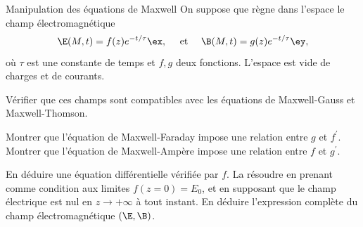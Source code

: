 
\begin{exo}[PC][1][TD]{Manipulation des équations de Maxwell}
On suppose que règne dans l'espace le champ électromagnétique 
\begin{equation}
  \E(M, t)=f(z) e^{-t / \tau} \ex, \quad \text{ et } \quad \B(M, t)=g(z) e^{-t / \tau} \ey,
\end{equation}
où $\tau$ est une constante de temps et $f, g$ deux fonctions. L'espace est vide de charges et de courants.
\begin{quest}
  \item   Vérifier que ces champs sont compatibles avec les équations de Maxwell-Gauss et Maxwell-Thomson.
  \item  Montrer que l'équation de Maxwell-Faraday impose une relation entre $g$ et $f^{\prime}$.  Montrer que l'équation de Maxwell-Ampère impose une relation entre $f$ et $g^{\prime}$.
  \item En déduire une équation différentielle vérifiée par $f$. La résoudre en prenant comme condition aux limites $f(z=0)=E_{0}$, et en supposant que le champ électrique est nul en $z \rightarrow+\infty$ à tout instant.  En déduire l'expression complète du champ électromagnétique $(\E,\B)$.
\end{quest}
\end{exo}

